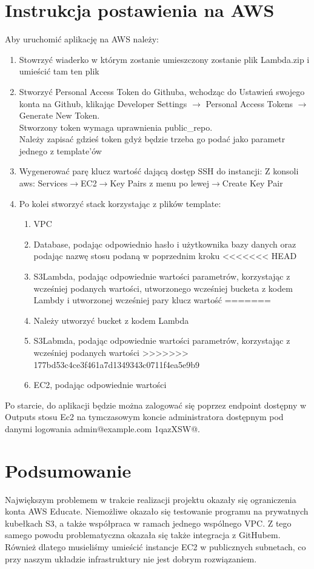 \documentclass[12pt,a4paper]{article}
\begin{document}
    \section{Instrukcja postawienia na AWS}
        Aby uruchomić aplikację na AWS należy:
	\begin{enumerate}
          \item Stowrzyć wiaderko w którym zostanie umieszczony zostanie plik Lambda.zip i umieścić tam ten plik
	  \item Stworzyć Personal Access Token do Githuba, wchodząc do Ustawień swojego konta na Github, klikając Developer Settings $\rightarrow$ Personal Access Tokens $\rightarrow$ Generate New Token.
	  \\Stworzony token wymaga uprawnienia public\_repo.
          \\Należy zapisać gdzieś token gdyż będzie trzeba go podać jako parametr jednego z template'ów
          \item Wygenerować parę klucz wartość dającą dostęp SSH do instancji: Z konsoli aws: Services$\rightarrow$EC2$\rightarrow$Key Pairs z menu po lewej$\rightarrow$Create Key Pair
	  \item Po kolei stworzyć stack korzystając z plików template:
          \begin{enumerate}
            \item VPC
            \item Database, podając odpowiednio hasło i użytkownika bazy danych oraz podając nazwę stosu podaną w poprzednim kroku
<<<<<<< HEAD
            \item S3Lambda, podając odpowiednie wartości parametrów, korzystając z wcześniej podanych wartości, utworzonego wcześniej bucketa z kodem Lambdy i utworzonej wcześniej pary klucz wartość
=======
            \item Należy utworzyć bucket z kodem Lambda
            \item S3Labmda, podając odpowiednie wartości parametrów, korzystając z wcześniej podanych wartości
>>>>>>> 177bd53c4ce3f461a7d1349343c0711f4ea5e9b9
            \item EC2, podając odpowiednie wartości
          \end{enumerate}
       \end{enumerate}
        Po starcie, do aplikacji będzie można zalogować się poprzez endpoint dostępny w Outputs stosu Ec2 na tymczasowym koncie administratora dostępnym pod danymi logowania admin@example.com 1qazXSW@.
    \section{Podsumowanie}
        Największym problemem w trakcie realizacji projektu okazały się ograniczenia konta AWS Educate.
        Niemożliwe okazało się testowanie programu na prywatnych kubełkach S3, a także współpraca w ramach jednego wspólnego VPC.
        Z tego samego powodu problematyczna okazała się także integracja z GitHubem.
        Również dlatego musieliśmy umieścić instancje EC2 w publicznych subnetach, co przy naszym układzie infrastruktury nie jest dobrym rozwiązaniem.
\end{document}
